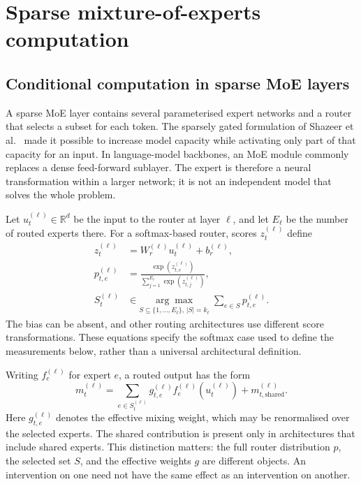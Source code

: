 \documentclass[12pt,a4paper,twoside,openright]{book}
\begin{document}
\section{Sparse mixture-of-experts computation}
\label{sec:moe-computation}

\subsection{Conditional computation in sparse MoE layers}

A sparse MoE layer contains several parameterised expert networks and a router
that selects a subset for each token. The sparsely gated formulation of
Shazeer et al.~\cite{shazeer2017sparselygated} made it possible to increase
model capacity while activating only part of that capacity for an input.
In language-model backbones, an MoE module commonly replaces a dense
feed-forward sublayer. The expert is therefore a neural transformation within
a larger network; it is not an independent model that solves the whole
problem.

Let $u_t^{(\ell)}\in\mathbb{R}^{d}$ be the input to the router at layer
$\ell$, and let $E_\ell$ be the number of routed experts there. For a
softmax-based router, scores $z_t^{(\ell)}$ define
\begin{align}
  z_t^{(\ell)} &= W_r^{(\ell)}u_t^{(\ell)}+b_r^{(\ell)}, \\
  p_{t,e}^{(\ell)} &=
  \frac{\exp(z_{t,e}^{(\ell)})}
       {\sum_{j=1}^{E_\ell}\exp(z_{t,j}^{(\ell)})}, \\
  S_t^{(\ell)} &\in \underset{S\subseteq\{1,\ldots,E_\ell\},\,|S|=k_\ell}{\arg\max}\;\sum_{e\in S}p_{t,e}^{(\ell)}.
  \label{eq:router-selection}
\end{align}
The bias can be absent, and other routing architectures use different score
transformations. These equations specify the softmax case used to define the
measurements below, rather than a universal architectural definition.

Writing $f_e^{(\ell)}$ for expert $e$, a routed output has the form
\begin{equation}
  m_t^{(\ell)} =
  \sum_{e\in S_t^{(\ell)}}
  g_{t,e}^{(\ell)}f_e^{(\ell)}(u_t^{(\ell)})
  + m_{t,\mathrm{shared}}^{(\ell)}.
  \label{eq:moe-output}
\end{equation}
Here $g_{t,e}^{(\ell)}$ denotes the effective mixing weight, which may be
renormalised over the selected experts. The shared contribution is present
only in architectures that include shared experts. This distinction matters:
the full router distribution $p$, the selected set $S$, and the effective
weights $g$ are different objects. An intervention on one need not have the
same effect as an intervention on another.
\end{document}
